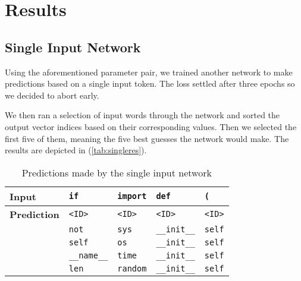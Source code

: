 \section{Results}
\label{sec:results}

  \subsection{Single Input Network}
  \label{sub:single_input_network}
  
    Using the aforementioned parameter pair, we trained another network to make predictions based on
    a single input token. The loss settled after three epochs so we decided to abort early.

    We then ran a selection of input words through the network and sorted the output vector indices
    based on their corresponding values. Then we selected the first five of them, meaning the five
    best guesses the network would make. The results are depicted in (\ref{tab:singleres}).
    
    \begin{table}[htpb]
      \centering
      \label{tab:label}
      \begin{tabular}{l | l | l | l | l}
        \textbf{Input} & \verb+if+ & \verb+import+ & \verb+def+ & \verb+(+ \\ \hline  
        \textbf{Prediction}  &  \verb+<ID>+ &\verb+<ID>+  & \verb+<ID>+ & \verb+<ID>+ \\
          & \verb+not+ & \verb+sys+ & \verb+__init__+ & \verb+self+ \\
          & \verb+self+ & \verb+os+ & \verb+__init__+ & \verb+self+ \\
          & \verb+__name__+ & \verb+time+ & \verb+__init__+ & \verb+self+ \\
          & \verb+len+ & \verb+random+ & \verb+__init__+ & \verb+self+ \\
      \end{tabular}
      \caption{Predictions made by the single input network}
    \end{table}

